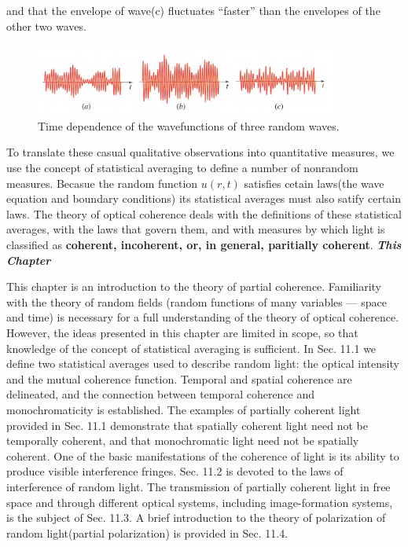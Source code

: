 \documentclass{article}
\numberwithin{figure}{subsection}
\numberwithin{table}{subsection}
\begin{document}
and that the envelope of wave(c) fluctuates ``faster'' than the envelopes of the other two waves.
\begin{figure}[ht]
\centering
\includegraphics[width=0.9\textwidth]{11_0_2.PNG}
\caption{Time dependence of the wavefunctions of three random waves.}
\label{fig: 11_0_2}
\end{figure}
\par To translate these casual qualitative observations into quantitative measures, we use the concept of statistical averaging to define a number of nonrandom measures. Becasue the random function $ u(r,t) $
satisfies cetain laws(the wave equation and boundary conditions) its statistical averages must also satify certain laws. The theory of optical coherence deals with the definitions of these statistical averages, with the laws that govern them, and with measures by which light is classified as \textbf{coherent, incoherent, \textnormal{or, in general,} paritially coherent}.
\bigbreak\noindent\textcolor{ksc}{\textbf{\textsl{This Chapter}}}
\par This chapter is an introduction to the theory of partial coherence. Familiarity with the
theory of random fields (random functions of many variables — space and time) is
necessary for a full understanding of the theory of optical coherence. However, the
ideas presented in this chapter are limited in scope, so that knowledge of the concept
of statistical averaging is sufficient.
In Sec. 11.1 we define two statistical averages used to describe random light: the optical
intensity and the mutual coherence function. Temporal and spatial coherence are
delineated, and the connection between temporal coherence and monochromaticity is
established. The examples of partially coherent light provided in Sec. 11.1 demonstrate
that spatially coherent light need not be temporally coherent, and that monochromatic
light need not be spatially coherent. One of the basic manifestations of the coherence
of light is its ability to produce visible interference fringes. Sec. 11.2 is devoted to the
laws of interference of random light. The transmission of partially coherent light in
free space and through different optical systems, including image-formation systems,
is the subject of Sec. 11.3. A brief introduction to the theory of polarization of random
light(partial polarization) is provided in Sec. 11.4.
\end{document}

